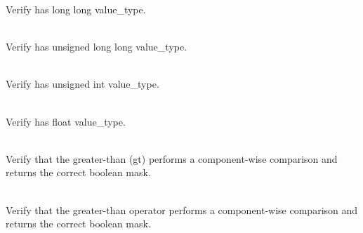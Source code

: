 \begin{DoxyRefList}
Verify  has long long value\+\_\+type.  
\item[{\parbox[t]{\linewidth}{Member \doxylink{group___f_g_m___vec4___alias_ga249ac71ed3af8c8e6ba3a669c0115140}{Vector4\+DAlias\+\_\+ul\+Vec4\+Is\+A4\+DUnsigned\+Long\+Long\+Vector} ()}}]\hfill \\
\label{test__test000016}%
%
Verify  has unsigned long long value\+\_\+type.  
\item[{\parbox[t]{\linewidth}{Member \doxylink{group___f_g_m___vec4___alias_ga09dcb1d13bac5d6bd68da6ace3b1ee22}{Vector4\+DAlias\+\_\+u\+Vec4\+Is\+A4\+DUnsigned\+Int\+Vector} ()}}]\hfill \\
\label{test__test000012}%
%
Verify  has unsigned int value\+\_\+type.  
\item[{\parbox[t]{\linewidth}{Member \doxylink{group___f_g_m___vec4___alias_ga092bb36404ddf5b6686b629dc780e26c}{Vector4\+DAlias\+\_\+vec4\+Is\+A4\+DFloat\+Vector} ()}}]\hfill \\
\label{test__test000013}%
%
Verify  has float value\+\_\+type.  
\item[{\parbox[t]{\linewidth}{Member \doxylink{group___f_g_m___vec4___g_t___comp_ga0975f4c32bdc910c037444bae5372efc}{Vector4\+DComparison\+\_\+\+Greater\+Than\+\_\+\+Returns\+Boolean\+Vector\+With\+Elements\+Greater\+Than\+As\+True} ()}}]\hfill \\
\label{test__test000043}%
%
Verify that the  greater-\/than (gt) performs a component-\/wise comparison and returns the correct boolean mask.  
\item[{\parbox[t]{\linewidth}{Member \doxylink{group___f_g_m___vec4___g_t___comp_ga7a69e7e3f6188ba06e7b7038e1580c97}{Vector4\+DComparison\+\_\+\+Greater\+Than\+Operator\+\_\+\+Returns\+Boolean\+Vector\+With\+Elements\+Greater\+Than\+As\+True} ()}}]\hfill \\
\label{test__test000044}%
%
Verify that the  greater-\/than operator performs a component-\/wise comparison and returns the correct boolean mask.  
\item[{\parbox[t]{\linewidth}{Member \doxylink{group___f_g_m___vec4___g_t_e___comp_ga4a12ab678c3730040207bb93a37b9196}{Vector4\+DComparison\+\_\+\+Greater\+Than\+Or\+Equal\+\_\+\+Returns\+Boolean\+Vector\+With\+Elements\+Greater\+Than\+Or\+Equal\+As\+True} ()}}]\hfill \\

\end{DoxyRefList}
